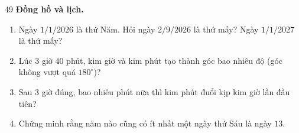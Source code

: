 \begin{probbox}{49}{}
\textbf{Đồng hồ và lịch.}
\begin{enumerate}[label=\alph*),leftmargin=1.6em,itemsep=1pt,topsep=2pt]
  \item Ngày $1/1/2026$ là thứ Năm. Hỏi ngày $2/9/2026$ là thứ mấy? Ngày $1/1/2027$ là thứ mấy?
  \item Lúc $3$ giờ $40$ phút, kim giờ và kim phút tạo thành góc bao nhiêu độ (góc không vượt quá $180^\circ$)?
  \item Sau $3$ giờ đúng, bao nhiêu phút nữa thì kim phút đuổi kịp kim giờ lần đầu tiên?
  \item {} Chứng minh rằng năm nào cũng có ít nhất một ngày thứ Sáu là ngày $13$.
\end{enumerate}
\end{probbox}
